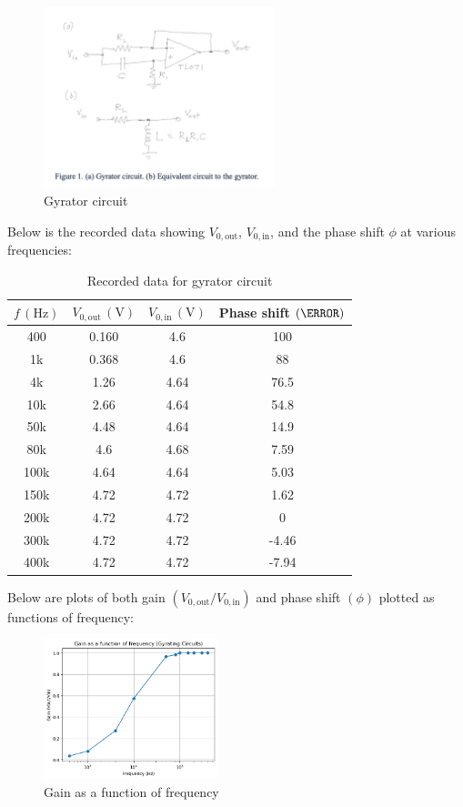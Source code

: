 \documentclass{article}
\begin{document}
\begin{figure}[H]
    \centering
    \includegraphics[width=0.6\textwidth]{img/Lab 9/1_1.png} %
    \caption{Gyrator circuit}
\end{figure}

Below is the recorded data showing \( V_{0,\text{out}} \), \( V_{0,\text{in}} \), 
and the phase shift \( \phi \) at various frequencies:

\begin{table}[H]
\centering
\begin{tabular}{|c|c|c|c|}
\hline
\( f \, (\text{Hz}) \) & \( V_{0,\text{out}} \, (\text{V}) \) & \( V_{0,\text{in}} \, (\text{V}) \) & Phase shift \( (\degree) \) \\
\hline
400   & 0.160 & 4.6  & 100 \\
1k    & 0.368 & 4.6  & 88  \\
4k    & 1.26  & 4.64 & 76.5 \\
10k   & 2.66  & 4.64 & 54.8 \\
50k   & 4.48  & 4.64 & 14.9 \\
80k   & 4.6   & 4.68 & 7.59 \\
100k  & 4.64  & 4.64 & 5.03 \\
150k  & 4.72  & 4.72 & 1.62 \\
200k  & 4.72  & 4.72 & 0 \\
300k  & 4.72  & 4.72 & -4.46 \\
400k  & 4.72  & 4.72 & -7.94 \\
\hline
\end{tabular}
\caption{Recorded data for gyrator circuit}
\end{table}

Below are plots of both gain \( (V_{0,\text{out}}/V_{0,\text{in}}) \) 
and phase shift \( (\phi) \) plotted as functions of frequency:

\begin{figure}[H]
    \centering
    \includegraphics[width=0.45\textwidth]{img/Lab 9/1_2.png} %
    \caption{Gain as a function of frequency}
    \label{fig:gain}
\end{figure}
\end{document}
